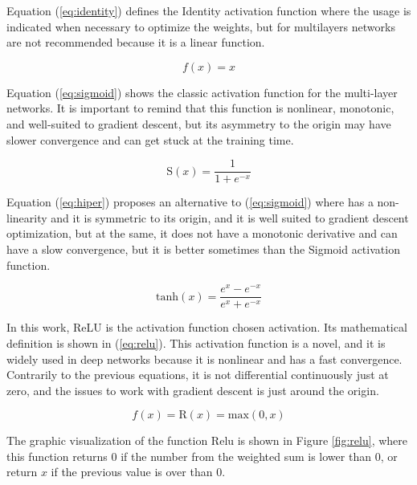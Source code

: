         


Equation (\ref{eq:identity}) defines the Identity activation function where the usage is indicated when necessary to optimize the weights, but for multilayers networks are not recommended because it is a linear function. 


\begin{equation}\label{eq:identity}
    f(x) = x
\end{equation}


Equation (\ref{eq:sigmoid}) shows the classic activation function for the multi-layer networks. It is important to remind that this function is nonlinear, monotonic, and well-suited to gradient descent, but its asymmetry to the origin may have slower convergence and can get stuck at the training time.     


\begin{equation}\label{eq:sigmoid}
    \mathrm{S}(x) = \frac{1}{1+e^{-x}}
\end{equation}

        
Equation (\ref{eq:hiper}) proposes an alternative to (\ref{eq:sigmoid}) where has a non-linearity and it is symmetric to its origin, and it is well suited to gradient descent optimization, but at the same, it does not have a monotonic derivative and can have a slow convergence, but it is better sometimes than the Sigmoid activation function.


\begin{equation}\label{eq:hiper}
 \mathrm{tanh}(x) = \frac{e^{x}-e^{-x}}{e^{x}+e^{-x}}
\end{equation}


    


In this work, ReLU is the activation function chosen activation. Its mathematical definition is shown in (\ref{eq:relu}). This activation function is a novel, and it is widely used in deep networks because it is nonlinear and has a fast convergence. Contrarily to the previous equations, it is not differential continuously just at zero, and the issues to work with gradient descent is just around the origin. 


\begin{equation}
\label{eq:relu}
    f(x) = \mathrm{R}(x) = \mathrm{max}(0,x)
\end{equation}


The graphic visualization of the function Relu is shown in Figure \ref{fig:relu}, where this function returns $0$ if the number from the weighted sum is lower than $0$, or return $x$ if the previous value is over than $0$.


